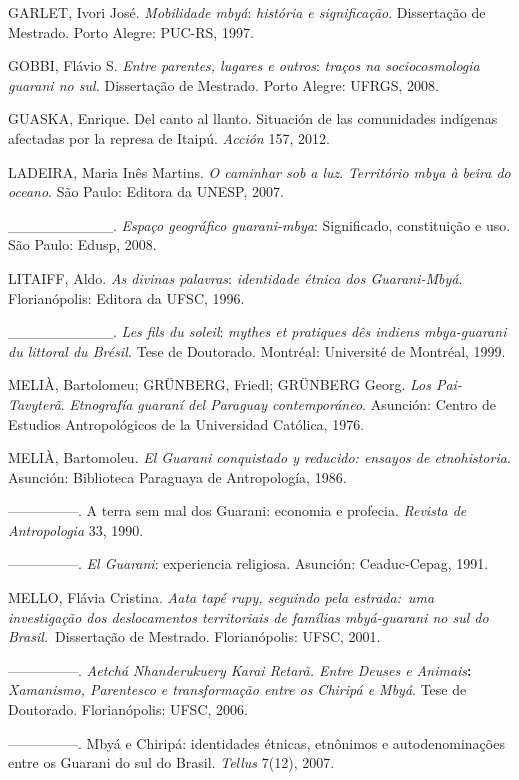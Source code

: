 GARLET, Ivori José. \emph{Mobilidade mbyá}: \emph{história e
significação}. Dissertação de Mestrado. Porto Alegre: PUC-RS, 1997.

GOBBI, Flávio S. \emph{Entre parentes, lugares e outros}: \emph{traços
na sociocosmologia guarani no sul.} Dissertação de Mestrado. Porto
Alegre: UFRGS, 2008.

GUASKA, Enrique. Del canto al llanto. Situación de las comunidades
indígenas afectadas por la represa de Itaipú. \emph{Acción} 157, 2012.

LADEIRA, Maria Inês Martins. \emph{O caminhar sob a luz}.
\emph{Território mbya à beira do oceano}. São Paulo: Editora da UNESP,
2007.

\_\_\_\_\_\_\_\_\_\_. \emph{Espaço geográfico guarani-mbya}:
Significado, constituição e uso. São Paulo: Edusp, 2008.

LITAIFF, Aldo. \emph{As divinas palavras}: \emph{identidade étnica dos
Guarani-Mbyá}. Florianópolis: Editora da UFSC, 1996.

\_\_\_\_\_\_\_\_\_\_. \emph{Les fils du soleil}: \emph{mythes et
pratiques dês indiens mbya-guarani du littoral du Brésil.} Tese de
Doutorado. Montréal: Université de Montréal, 1999.

MELIÀ, Bartolomeu; GRÜNBERG, Friedl; GRÜNBERG Georg. \emph{Los
Pai-Tavyterã}. \emph{Etnografía guaraní del Paraguay contemporáneo}.
Asunción: Centro de Estudios Antropológicos de la Universidad Católica,
1976.

MELIÀ, Bartomoleu. \emph{El Guarani conquistado y reducido: ensayos de
etnohistoria}. Asunción: Biblioteca Paraguaya de Antropología, 1986.

---------------. A terra sem mal dos Guarani: economia e profecia.
\emph{Revista de Antropologia} 33, 1990.

---------------. \emph{El Guarani}: experiencia religiosa. Asunción:
Ceaduc-Cepag, 1991.

MELLO, Flávia Cristina. \emph{Aata tapé rupy, seguindo pela estrada:~uma
investigação dos deslocamentos territoriais de famílias mbyá-guarani no
sul do Brasil.}~Dissertação de Mestrado. Florianópolis: UFSC, 2001.

---------------. \emph{Aetchá Nhanderukuery Karai Retarã. Entre Deuses e
Animais}\textbf{:} \emph{Xamanismo, Parentesco e transformação entre os
Chiripá e Mbyá}. Tese de Doutorado. Florianópolis: UFSC, 2006.

---------------. Mbyá e Chiripá: identidades étnicas, etnônimos e
autodenominações entre os Guarani do sul do Brasil. \emph{Tellus} 7(12),
2007.

